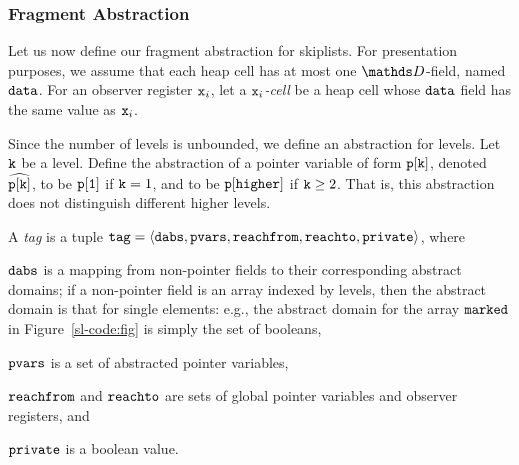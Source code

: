 \vspace*{-0.6cm}
\subsubsection{Fragment Abstraction}
Let us now define our fragment abstraction for skiplists.
For presentation purposes, we assume that each heap cell has at most one
$\ddomain$-field, named ${\tt data}$.
For an observer register $\mathtt{x}_i$, let a {\em $\mathtt{x}_i$-cell} be a heap cell whose
${\tt data}$ field has the same value as $\mathtt{x}_i$.

Since the number of levels is unbounded, we define an abstraction for
levels.
Let ${\tt k}$ be a level.
Define the abstraction of a pointer variable of form $\tt p[k]$,
denoted $\widehat{\mathtt{p[k]}}$,
to be $\tt p[1]$ if ${\tt k} = 1$, and to be  $\tt p[higher]$
if ${\tt k} \geq 2$.
That is, this abstraction does not distinguish different higher levels.

A {\em tag} is a tuple $\mathtt{tag} = \left\langle\mathtt{dabs},\mathtt{pvars},\mathtt{reachfrom},\mathtt{reachto},\mathtt{private}\right\rangle$, where
\begin{inparaenum}[(i)]
\item
  $\mathtt{dabs}$ is a mapping from non-pointer fields
  to their corresponding abstract domains;
  if a non-pointer field is an array indexed by levels, then
the abstract domain is that for single elements: e.g., the abstract
domain for the array ${\tt marked}$ in Figure~\ref{sl-code:fig} is simply the
set of booleans,
\item
  $\mathtt{pvars}$ is a set of abstracted pointer variables,
 \item
   $\mathtt{reachfrom}$ and $\mathtt{reachto}$ are sets of global pointer variables and observer registers, and
  \item $\mathtt{private}$ is a boolean value.
\end{inparaenum}

